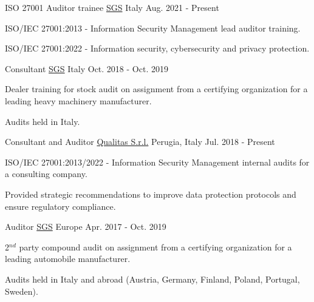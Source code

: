\begin{cventries}
  \cventry
  {ISO 27001 Auditor trainee} %
  {\href{https://sgs.com}{SGS}} %
  {Italy} %
  {Aug. 2021 - Present} %
  {
    \begin{cvitems} %
      \item {ISO/IEC 27001:2013 - Information Security Management lead auditor training.}
      \item {ISO/IEC 27001:2022 - Information security, cybersecurity and privacy protection.}
    \end{cvitems}
  }

  \cventry
  {Consultant} %
  {\href{https://sgs.com}{SGS}} %
  {Italy} %
  {Oct. 2018 - Oct. 2019} %
  {
    \begin{cvitems} %
      \item {Dealer training for stock audit on assignment from a certifying organization for a leading heavy machinery manufacturer.}
      \item {Audits held in Italy.}
    \end{cvitems}
  }

  \cventry
  {Consultant and Auditor} %
  {\href{https://www.qualitas.eu}{Qualitas S.r.l.}} %
  {Perugia, Italy} %
  {Jul. 2018 - Present} %
  {
    \begin{cvitems} %
      \item {ISO/IEC 27001:2013/2022 - Information Security Management internal audits for a consulting company.}
      \item {Provided strategic recommendations to improve data protection protocols and ensure regulatory compliance.}
    \end{cvitems}
  }

  \cventry
  {Auditor} %
  {\href{https://sgs.com}{SGS}} %
  {Europe} %
  {Apr. 2017 - Oct. 2019} %
  {
    \begin{cvitems} %
      \item {2$^{nd}$ party compound audit on assignment from a certifying organization for a leading automobile manufacturer.}
      \item {Audits held in Italy and abroad (Austria, Germany, Finland, Poland, Portugal, Sweden).}
    \end{cvitems}
  }


\end{cventries}
